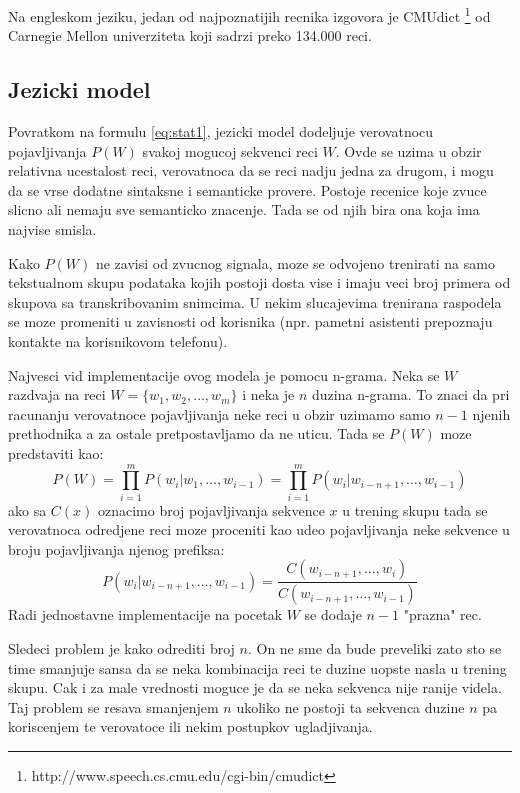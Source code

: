 \documentclass[a4paper]{article}
\begin{document}
Na engleskom jeziku, jedan od najpoznatijih recnika izgovora je CMUdict \footnote{http://www.speech.cs.cmu.edu/cgi-bin/cmudict} od Carnegie Mellon univerziteta koji sadrzi preko 134.000 reci.

\subsection{Jezicki model}
Povratkom na formulu \ref{eq:stat1}, jezicki model dodeljuje verovatnocu pojavljivanja $P(W)$ svakoj mogucoj sekvenci reci $W$.
Ovde se uzima u obzir relativna ucestalost reci, verovatnoca da se reci nadju jedna za drugom, i mogu da se vrse dodatne sintaksne i semanticke provere.
Postoje recenice koje zvuce slicno ali nemaju sve semanticko znacenje.
Tada se od njih bira ona koja ima najvise smisla.

Kako $P(W)$ ne zavisi od zvucnog signala, moze se odvojeno trenirati na samo tekstualnom skupu podataka kojih postoji dosta vise i imaju veci broj primera od skupova sa transkribovanim snimcima.
U nekim slucajevima trenirana raspodela se moze promeniti u zavisnosti od korisnika (npr. pametni asistenti prepoznaju kontakte na korisnikovom telefonu).

Najvesci vid implementacije ovog modela je pomocu n-grama.
Neka se $W$ razdvaja na reci $W = \{w_1, w_2, \dots, w_m\}$ i neka je $n$ duzina n-grama.
To znaci da pri racunanju verovatnoce pojavljivanja neke reci u obzir uzimamo samo $n-1$ njenih prethodnika a za ostale pretpostavljamo da ne uticu.
Tada se $P(W)$ moze predstaviti kao:
\begin{equation*}
  P(W) = \prod_{i=1}^{m} P(w_i | w_1,\dots,w_{i-1}) = \prod_{i=1}^{m} P(w_i | w_{i-n+1},\dots,w_{i-1})
\end{equation*}
ako sa $C(x)$ oznacimo broj pojavljivanja sekvence $x$ u trening skupu tada se verovatnoca odredjene reci moze proceniti kao udeo pojavljivanja neke sekvence u broju pojavljivanja njenog prefiksa:
\begin{equation*}
  P(w_i | w_{i-n+1},\dots,w_{i-1}) = \frac{C(w_{i-n+1},\dots,w_i)}{C(w_{i-n+1},\dots,w_{i-1})}
\end{equation*}
Radi jednostavne implementacije na pocetak $W$ se dodaje $n-1$ "prazna" rec.

Sledeci problem je kako odrediti broj $n$.
On ne sme da bude preveliki zato sto se time smanjuje sansa da se neka kombinacija reci te duzine uopste nasla u trening skupu.
Cak i za male vrednosti moguce je da se neka sekvenca nije ranije videla. 
Taj problem se resava smanjenjem $n$ ukoliko ne postoji ta sekvenca duzine $n$ pa koriscenjem te verovatoce ili nekim postupkov ugladjivanja.
\end{document}
